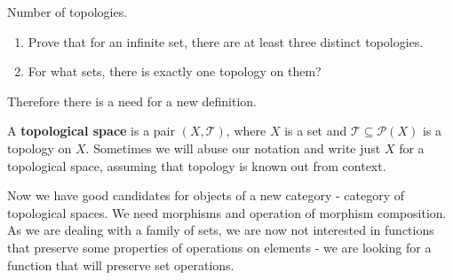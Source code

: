 \begin{exercise}
  Number of topologies.
  \begin{enumerate}
    \item Prove that for an infinite set, there are at least three distinct topologies.
    \item For what sets, there is exactly one topology on them?
  \end{enumerate}
\end{exercise}



Therefore there is a need for a new definition.

\begin{definition}
  A \textbf{topological space} is a pair $(X, \mathcal T)$, where $X$ is a set and $\mathcal T\subseteq \mathcal P(X)$ is a topology on $X$. Sometimes we will abuse our notation and write just $X$ for a topological space, assuming that topology is known out from context.
\end{definition}

Now we have good candidates for objects of a new category - category of topological spaces. We need morphisms and operation of morphism composition. As we are dealing with a family of sets, we are now not interested in functions that preserve some properties of operations on elements - we are looking for a function that will preserve set operations.


